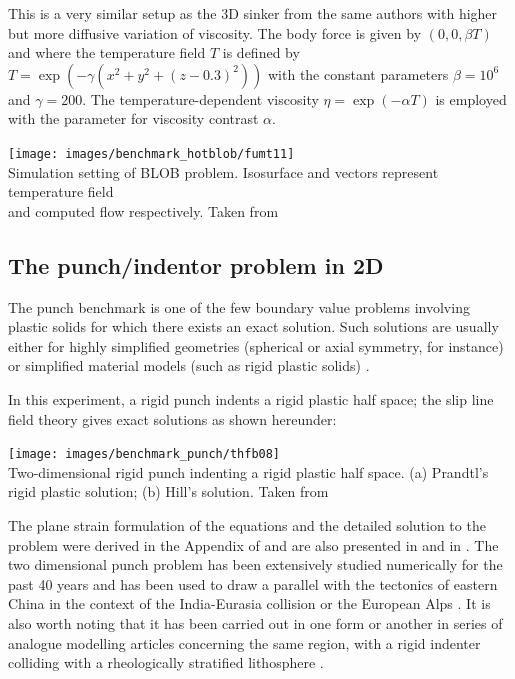 This is a very similar setup as the 3D sinker from the same authors
with higher but more diffusive variation of viscosity.
The body force is given by $(0, 0, \beta T)$ and
where the temperature field $T$ is defined by $T = \exp  (-\gamma (x^2+y^2+(z-0.3)^2))$ 
with the constant parameters $\beta=10^6$ and $\gamma=200$. 
The temperature-dependent viscosity $\eta = \exp( -\alpha T)$ is employed with the parameter for viscosity
contrast $\alpha$.

\begin{center}
\texttt{[image: images/benchmark\_hotblob/fumt11]}\\
{\captionfont Simulation setting of BLOB problem. Isosurface and vectors represent temperature field \\and computed flow respectively. Taken from \cite{fumt11}}
\end{center}

\subsection{The punch/indentor problem in 2D} \label{sec:punch}

The punch benchmark is one of the few boundary value problems involving plastic solids 
for which there exists an exact solution. 
Such solutions are usually either for highly simplified geometries (spherical or axial 
symmetry, for instance) or simplified material models (such as rigid plastic solids) \cite{kacha04}.

In this experiment, a rigid punch indents a rigid plastic half space; the slip line field theory gives 
exact solutions as shown hereunder:

\begin{center}
\texttt{[image: images/benchmark\_punch/thfb08]}\\
{\captionfont Two-dimensional rigid punch indenting a rigid
plastic half space. (a) Prandtl's rigid plastic solution; (b)
Hill's solution. Taken from \cite{thfb08}}
\end{center}

The plane strain formulation of the equations and the detailed solution to the problem 
were derived in the Appendix of \cite{thfb08} and are also presented in \cite{gepd98} 
and in \cite[Chapt.6]{bower2009}.
The two dimensional punch problem has been extensively studied numerically for the past 40 years 
\cite{zihl75,prlo90,zihp95,ziph95,chpe01,chan99,huhy99,yuti06,bufs08,raab07,gltf18} and has been used to draw a parallel with the tectonics of eastern China in the context of the 
India-Eurasia collision \cite{tamo76,mota77,engl82} or the European Alps \cite{repe97}.
It is also worth noting that it has been carried out in one form or another in series of 
analogue modelling articles concerning the same region, with a rigid indenter colliding with a rheologically 
stratified lithosphere \cite{tapl82,peta88,daco88,jodc90}.


